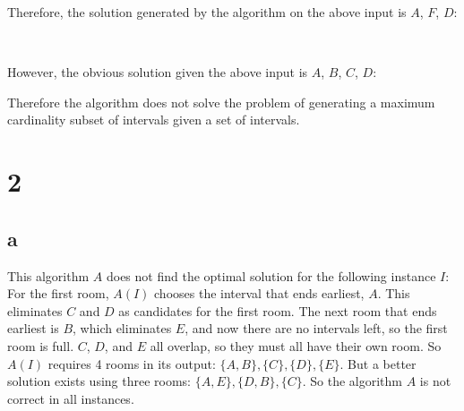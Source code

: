\documentclass[letterpaper,notitlepage,twoside]{article}
\newcommand\tab[1][1cm]{\hspace*{#1}} %
\begin{document}
Therefore, the solution generated by the algorithm on the above input is $A$, $F$, $D$:
\begin{center}
\tab\tab{}
\\
\end{center}
However, the obvious solution given the above input is $A$, $B$, $C$, $D$:
\begin{center}
\end{center}
Therefore the algorithm does not solve the problem of generating a maximum cardinality subset of intervals given a set of intervals.

\section*{2}
\subsection*{a}
This algorithm $A$ does not find the optimal solution for the following instance $I$: For the first room, $A(I)$ chooses the interval that ends earliest, $A$. This eliminates $C$ and $D$ as candidates for the first room. The next room that ends earliest is $B$, which eliminates $E$, and now there are no intervals left, so the first room is full. $C$, $D$, and $E$ all overlap, so they must all have their own room. So $A(I)$ requires 4 rooms in its output: $\{A, B\}, \{C\}, \{D\}, \{E\}$. But a better solution exists using three rooms: $\{A, E\}, \{D, B\}, \{C\}$. So the algorithm $A$ is not correct in all instances.
\end{document}
